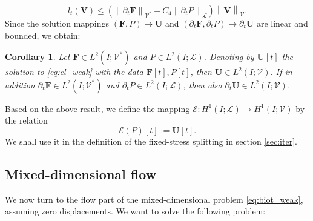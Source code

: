 \documentclass[a4paper]{article}
\newtheorem{corollary}[theorem]{Corollary}
\numberwithin{equation}{section}
\def\dt{\prtl_t}
\def\FF{\vc F}
\def\Hf{\mathscr{L}} %
\def\norm#1{\left\|#1\right\|}
\def\prtl{\partial}
\def\U{\vc U}
\def\V{\vc V}
\def\Vel{{\boldsymbol{\mathcal V}}} %
\def\Vf{{\mathcal V}} %
\def\vc#1{\mathbf{#1}}     %
\newcommand{\eqs}[1]{\begin{equation*}#1\end{equation*}}
\begin{document}
\eqs{ l_t(\V) \le \left(\norm{\dt\FF}_{\Vel^*} + C_4\norm{\dt P}_\Hf\right)\norm{\V}_\Vel. }
Since the solution mappings $(\FF,P) \mapsto \U$ and $(\dt\FF,\dt P)\mapsto\dt\U$ are linear and bounded, we obtain:
\begin{corollary}
Let $\FF\in L^2( I;\Vel^*)$ and $P\in L^2( I;\Hf)$.
Denoting by $\U[t]$ the solution to \eqref{eq:el_weak} with the data $\FF[t],P[t]$, then $\U\in L^2( I;\Vel)$.
If in addition $\dt\FF\in L^2( I;\Vel^*)$ and $\dt P\in L^2( I;\Hf)$, then also $\dt\U\in L^2( I;\Vel)$.
\end{corollary}
% 
Based on the above result, we define the mapping $\mathcal E: H^1( I;\Hf)\to H^1( I;\Vel)$ by the relation
\eqs{ \mathcal E(P)[t] := \U[t]. }
We shall use it in the definition of the fixed-stress splitting in section \ref{sec:iter}.


\subsection{Mixed-dimensional flow}\label{sec:wellposedness_flow}

We now turn to the flow part of the mixed-dimensional problem \eqref{eq:biot_weak}, assuming zero displacements.
We want to solve the following problem:
\end{document}

